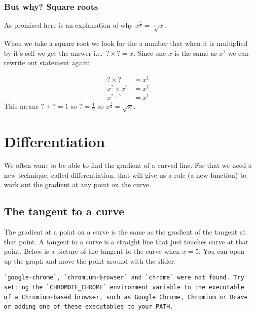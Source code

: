 \documentclass[
  a4paper,
]{scrbook}
\begin{document}
\subsection{But why? Square roots}\label{but-why-square-roots}

As promised here is an explanation of why
\(x^{\frac{1}{n}} = \sqrt[n]x\).

When we take a square root we look for the a number that when it is
multiplied by it's self we get the answer i.e.~\(? \times ? = x\). Since
one \(x\) is the same as \(x^1\) we can rewrite out statement again:

\[
\begin{aligned} ? \times ? &= x^1 \\
x^? \times x^? &= x^1 \\
x^{?+?} &= x^1
\end{aligned}
\] This means \(? + ? = 1\) so \(?=\frac{1}{2}\) so
\(x^{\frac{1}{2}} = \sqrt{x}\).


\chapter{Differentiation}\label{differentiation}

We often want to be able to find the gradient of a curved line. For that
we need a new technique, called differentiation, that will give us a
rule (a new function) to work out the gradient at any point on the
curve.

\section{The tangent to a curve}\label{the-tangent-to-a-curve}

The gradient at a point on a curve is the same as the gradient of the
tangent at that point. A tangent to a curve is a straight line that just
touches curve at that point. Below is a picture of the tangent to the
curve when \(x=5\). You can open up the graph and move the point around
with the slider.

\begin{verbatim}
`google-chrome`, `chromium-browser` and `chrome` were not found. Try setting the `CHROMOTE_CHROME` environment variable to the executable of a Chromium-based browser, such as Google Chrome, Chromium or Brave or adding one of these executables to your PATH.
\end{verbatim}
\end{document}
